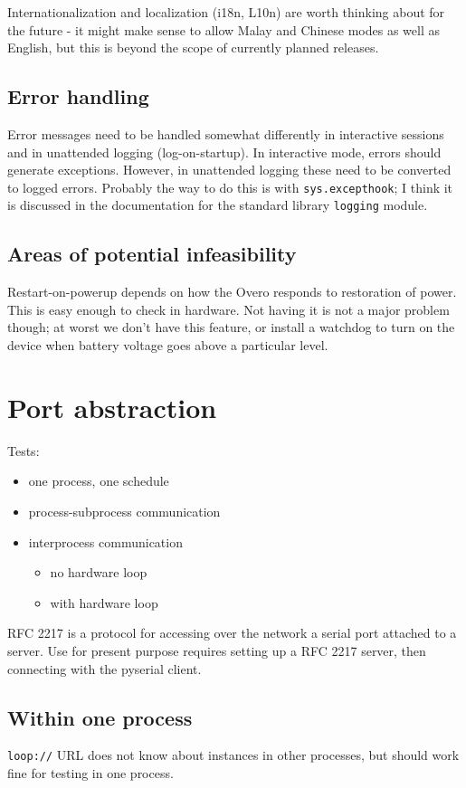 \documentclass[pdftex,oneside,12pt,a4paper]{book}
\begin{document}
Internationalization and localization (i18n, L10n) are worth thinking about for the future - it might make sense to allow Malay and Chinese modes as well as English, but this is beyond the scope of currently planned releases.

\section{Error handling}
Error messages need to be handled somewhat differently in interactive sessions and in unattended logging (log-on-startup). In interactive mode, errors should generate exceptions.  However, in unattended logging these need to be converted to logged errors.  Probably the way to do this is with \verb|sys.excepthook|; I think it is discussed in the documentation for the standard library \verb|logging| module.

\section{Areas of potential infeasibility}
Restart-on-powerup depends on how the Overo responds to restoration of power.  This is easy enough to check in hardware.  Not having it is not a major problem though; at worst we don't have this feature, or install a watchdog to turn on the device when battery voltage goes above a particular level.

\chapter{Port abstraction}
Tests:
\begin{itemize}
\item one process, one schedule
\item process-subprocess communication
\item interprocess communication
  \begin{itemize}
  \item no hardware loop
  \item with hardware loop
  \end{itemize}
\end{itemize}

RFC 2217 is a protocol for accessing over the network a serial port attached to a server.  Use for present purpose requires setting up a RFC 2217 server, then connecting with the pyserial client.

\section{Within one process}
\verb|loop://| URL does not know about instances in other processes, but should work fine for testing in one process.
\end{document}
